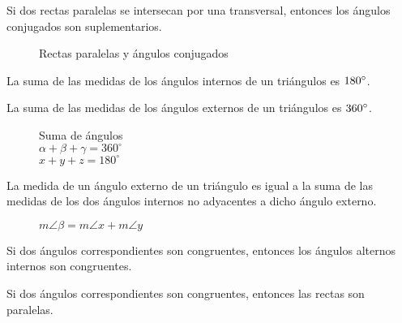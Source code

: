 \begin{theorem}
    Si dos rectas paralelas se intersecan por una transversal, entonces los ángulos conjugados son suplementarios.

\begin{figure}[!h]
    \centering
    
    \caption{$m\angle{\alpha} + m\angle{\beta} = \degs{180}$}
    \caption{Rectas paralelas y ángulos conjugados}
    \label{fig:theorem19}
\end{figure}
    
\end{theorem}

\clearpage

\begin{theorem}
    La suma de las medidas de los ángulos internos de un triángulos es $180^{\circ}$.
\end{theorem}

\begin{theorem}
    La suma de las medidas de los ángulos externos de un triángulos es $360^{\circ}$.
\end{theorem}

\begin{figure}[!h]
    \centering
    
    \caption{Suma de ángulos \\ $\alpha + \beta + \gamma = 360^{\circ}$\\$ x + y + z = 180^{\circ}$}
    \label{fig:theorem17}
\end{figure}

\begin{theorem}
    La medida de un ángulo externo de un triángulo es igual a la suma de las medidas de los dos ángulos internos no adyacentes a dicho ángulo externo.

\begin{figure}[!h]
    \centering
    
    \caption{$m\angle{\beta} = m\angle{x} + m\angle{y}$}
    \label{fig:theorem18}
\end{figure}
    
\end{theorem}

\begin{theorem}
    Si dos ángulos correspondientes son congruentes, entonces los ángulos alternos internos son congruentes.
\end{theorem}

\begin{theorem}
    Si dos ángulos correspondientes son congruentes, entonces las rectas son paralelas.
\end{theorem}

